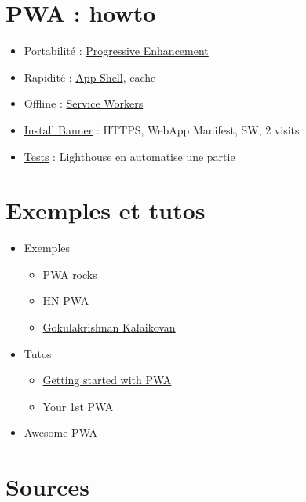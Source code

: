 \hypertarget{pwa-howto}{%
\section{PWA : howto}\label{pwa-howto}}

\begin{itemize}
\tightlist
\item
  Portabilité :
  \href{https://www.smashingmagazine.com/2009/04/progressive-enhancement-what-it-is-and-how-to-use-it/}{Progressive
  Enhancement}
\item
  Rapidité :
  \href{https://developers.google.com/web/updates/2015/11/app-shell}{App
  Shell}, cache
\item
  Offline :
  \href{https://jakearchibald.com/2014/service-worker-first-draft/}{Service
  Workers}
\item
  \href{https://developers.google.com/web/fundamentals/app-install-banners/}{Install
  Banner} : HTTPS, WebApp Manifest, SW, 2 visits
\item
  \href{https://developers.google.com/web/progressive-web-apps/checklist}{Tests}
  : Lighthouse en automatise une partie
\end{itemize}

\hypertarget{exemples-et-tutos}{%
\section{Exemples et tutos}\label{exemples-et-tutos}}

\begin{itemize}
\tightlist
\item
  Exemples

  \begin{itemize}
  \tightlist
  \item
    \href{https://pwa.rocks/}{PWA rocks}
  \item
    \href{https://hnpwa.com/}{HN PWA}
  \item
    \href{https://github.com/gokulkrishh}{Gokulakrishnan Kalaikovan}
  \end{itemize}
\item
  Tutos

  \begin{itemize}
  \tightlist
  \item
    \href{https://addyosmani.com/blog/getting-started-with-progressive-web-apps/}{Getting
    started with PWA}
  \item
    \href{https://developers.google.com/web/fundamentals/codelabs/your-first-pwapp/}{Your
    1st PWA}
  \end{itemize}
\item
  \href{https://github.com/hemanth/awesome-pwa}{Awesome PWA}
\end{itemize}

\hypertarget{sources}{%
\section{Sources}\label{sources}}
